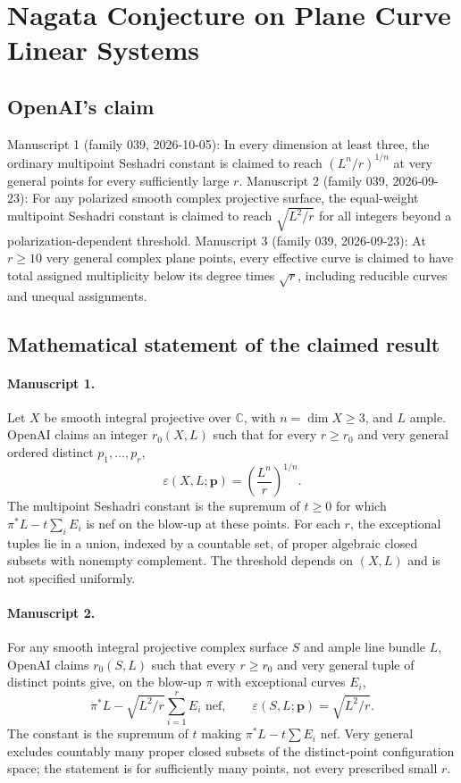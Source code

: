 \documentclass[11pt]{article}
\begin{document}
\section*{Nagata Conjecture on Plane Curve Linear Systems}

\subsection{OpenAI's claim}
Manuscript 1 (family 039, 2026-10-05): In every dimension at least three, the ordinary multipoint Seshadri constant is claimed to reach $(L^n/r)^{1/n}$ at very general points for every sufficiently large $r$. Manuscript 2 (family 039, 2026-09-23): For any polarized smooth complex projective surface, the equal-weight multipoint Seshadri constant is claimed to reach $\sqrt{L^2/r}$ for all integers beyond a polarization-dependent threshold. Manuscript 3 (family 039, 2026-09-23): At $r\ge10$ very general complex plane points, every effective curve is claimed to have total assigned multiplicity below its degree times $\sqrt r$, including reducible curves and unequal assignments.

\subsection{Mathematical statement of the claimed result}
\paragraph{Manuscript 1.}
Let $X$ be smooth integral projective over $\mathbb C$, with $n=\dim X\ge3$, and $L$ ample. OpenAI claims an integer $r_0(X,L)$ such that for every $r\ge r_0$ and very general ordered distinct $p_1,\ldots,p_r$,
\[
\varepsilon(X,L;\mathbf p)=\left(\frac{L^n}{r}\right)^{1/n}.
\]
The multipoint Seshadri constant is the supremum of $t\ge0$ for which $\pi^*L-t\sum_iE_i$ is nef on the blow-up at these points. For each $r$, the exceptional tuples lie in a union, indexed by a countable set, of proper algebraic closed subsets with nonempty complement. The threshold depends on $(X,L)$ and is not specified uniformly.

\paragraph{Manuscript 2.}
For any smooth integral projective complex surface $S$ and ample line bundle $L$, OpenAI claims $r_0(S,L)$ such that every $r\ge r_0$ and very general tuple of distinct points give, on the blow-up $\pi$ with exceptional curves $E_i$,
\[
\pi^*L-\sqrt{L^2/r}\sum_{i=1}^rE_i\text{ nef},\qquad
\varepsilon(S,L;\mathbf p)=\sqrt{L^2/r}.
\]
The constant is the supremum of $t$ making $\pi^*L-t\sum E_i$ nef. Very general excludes countably many proper closed subsets of the distinct-point configuration space; the statement is for sufficiently many points, not every prescribed small $r$.
\end{document}
